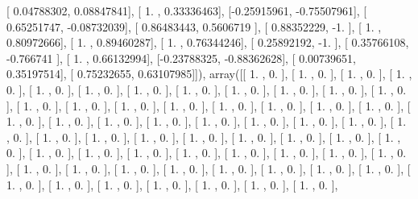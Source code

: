 \documentclass{article}
\begin{document}
       [ 0.04788302,  0.08847841],
       [ 1.        ,  0.33336463],
       [-0.25915961, -0.75507961],
       [ 0.65251747, -0.08732039],
       [ 0.86483443,  0.5606719 ],
       [ 0.88352229, -1.        ],
       [ 1.        ,  0.80972666],
       [ 1.        ,  0.89460287],
       [ 1.        ,  0.76344246],
       [ 0.25892192, -1.        ],
       [ 0.35766108, -0.766741  ],
       [ 1.        ,  0.66132994],
       [-0.23788325, -0.88362628],
       [ 0.00739651,  0.35197514],
       [ 0.75232655,  0.63107985]]), array([[ 1.        ,  0.        ],
       [ 1.        ,  0.        ],
       [ 1.        ,  0.        ],
       [ 1.        ,  0.        ],
       [ 1.        ,  0.        ],
       [ 1.        ,  0.        ],
       [ 1.        ,  0.        ],
       [ 1.        ,  0.        ],
       [ 1.        ,  0.        ],
       [ 1.        ,  0.        ],
       [ 1.        ,  0.        ],
       [ 1.        ,  0.        ],
       [ 1.        ,  0.        ],
       [ 1.        ,  0.        ],
       [ 1.        ,  0.        ],
       [ 1.        ,  0.        ],
       [ 1.        ,  0.        ],
       [ 1.        ,  0.        ],
       [ 1.        ,  0.        ],
       [ 1.        ,  0.        ],
       [ 1.        ,  0.        ],
       [ 1.        ,  0.        ],
       [ 1.        ,  0.        ],
       [ 1.        ,  0.        ],
       [ 1.        ,  0.        ],
       [ 1.        ,  0.        ],
       [ 1.        ,  0.        ],
       [ 1.        ,  0.        ],
       [ 1.        ,  0.        ],
       [ 1.        ,  0.        ],
       [ 1.        ,  0.        ],
       [ 1.        ,  0.        ],
       [ 1.        ,  0.        ],
       [ 1.        ,  0.        ],
       [ 1.        ,  0.        ],
       [ 1.        ,  0.        ],
       [ 1.        ,  0.        ],
       [ 1.        ,  0.        ],
       [ 1.        ,  0.        ],
       [ 1.        ,  0.        ],
       [ 1.        ,  0.        ],
       [ 1.        ,  0.        ],
       [ 1.        ,  0.        ],
       [ 1.        ,  0.        ],
       [ 1.        ,  0.        ],
       [ 1.        ,  0.        ],
       [ 1.        ,  0.        ],
       [ 1.        ,  0.        ],
       [ 1.        ,  0.        ],
       [ 1.        ,  0.        ],
       [ 1.        ,  0.        ],
       [ 1.        ,  0.        ],
       [ 1.        ,  0.        ],
       [ 1.        ,  0.        ],
       [ 1.        ,  0.        ],
       [ 1.        ,  0.        ],
       [ 1.        ,  0.        ],
       [ 1.        ,  0.        ],
       [ 1.        ,  0.        ],
       [ 1.        ,  0.        ],
\end{document}
